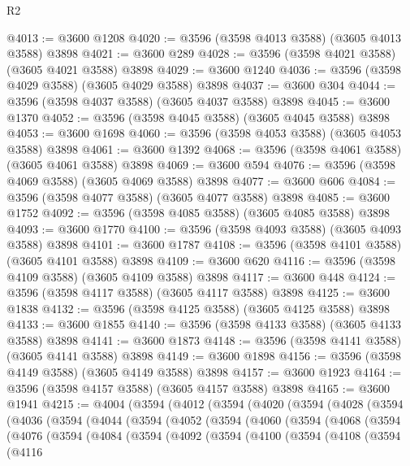 \begin{lexlean}{R2}
\begin{coremodule}
@4013 := @3600 @1208
@4020 := @3596 (@3598 @4013 @3588) (@3605 @4013 @3588) @3898
@4021 := @3600 @289
@4028 := @3596 (@3598 @4021 @3588) (@3605 @4021 @3588) @3898
@4029 := @3600 @1240
@4036 := @3596 (@3598 @4029 @3588) (@3605 @4029 @3588) @3898
@4037 := @3600 @304
@4044 := @3596 (@3598 @4037 @3588) (@3605 @4037 @3588) @3898
@4045 := @3600 @1370
@4052 := @3596 (@3598 @4045 @3588) (@3605 @4045 @3588) @3898
@4053 := @3600 @1698
@4060 := @3596 (@3598 @4053 @3588) (@3605 @4053 @3588) @3898
@4061 := @3600 @1392
@4068 := @3596 (@3598 @4061 @3588) (@3605 @4061 @3588) @3898
@4069 := @3600 @594
@4076 := @3596 (@3598 @4069 @3588) (@3605 @4069 @3588) @3898
@4077 := @3600 @606
@4084 := @3596 (@3598 @4077 @3588) (@3605 @4077 @3588) @3898
@4085 := @3600 @1752
@4092 := @3596 (@3598 @4085 @3588) (@3605 @4085 @3588) @3898
@4093 := @3600 @1770
@4100 := @3596 (@3598 @4093 @3588) (@3605 @4093 @3588) @3898
@4101 := @3600 @1787
@4108 := @3596 (@3598 @4101 @3588) (@3605 @4101 @3588) @3898
@4109 := @3600 @620
@4116 := @3596 (@3598 @4109 @3588) (@3605 @4109 @3588) @3898
@4117 := @3600 @448
@4124 := @3596 (@3598 @4117 @3588) (@3605 @4117 @3588) @3898
@4125 := @3600 @1838
@4132 := @3596 (@3598 @4125 @3588) (@3605 @4125 @3588) @3898
@4133 := @3600 @1855
@4140 := @3596 (@3598 @4133 @3588) (@3605 @4133 @3588) @3898
@4141 := @3600 @1873
@4148 := @3596 (@3598 @4141 @3588) (@3605 @4141 @3588) @3898
@4149 := @3600 @1898
@4156 := @3596 (@3598 @4149 @3588) (@3605 @4149 @3588) @3898
@4157 := @3600 @1923
@4164 := @3596 (@3598 @4157 @3588) (@3605 @4157 @3588) @3898
@4165 := @3600 @1941
@4215 := @4004
    (@3594
      (@4012
        (@3594
          (@4020
            (@3594
              (@4028
                (@3594
                  (@4036
                    (@3594
                      (@4044
                        (@3594
                          (@4052
                            (@3594
                              (@4060
                                (@3594
                                  (@4068
                                    (@3594
                                      (@4076
                                        (@3594
                                          (@4084
                                            (@3594
                                              (@4092
                                                (@3594
                                                  (@4100
                                                    (@3594
                                                      (@4108
                                                        (@3594
                                                          (@4116

\end{coremodule}
\end{lexlean}

